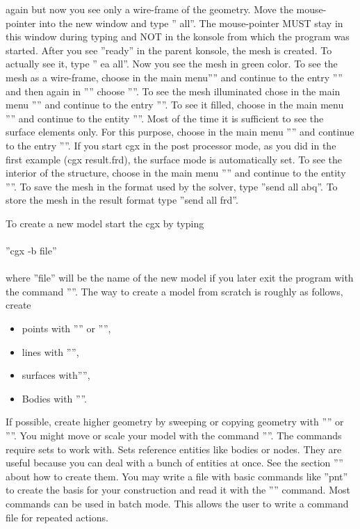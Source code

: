 \documentclass{article}
\begin{document}
again but now you see only a wire-frame of the geometry. Move the mouse-pointer into the new window and type '' all''. The mouse-pointer MUST stay in this window during typing and NOT in the konsole from which the program was started. After you see ''ready'' in the parent konsole, the mesh is created. To actually see it, type '' ea all''. Now you see the mesh in green color. To see the mesh as a wire-frame, choose in the main menu'''' and continue to the entry '''' and then again in '''' choose ''''. To see the mesh illuminated chose in the main menu '''' and continue to the entry ''''. To see it filled, choose in the main menu '''' and continue to the entity ''''. Most of the time it is sufficient to see the surface elements only. For this purpose, choose in the main menu '''' and continue to the entry ''''. If you start cgx in the post processor mode, as you did in the first example (cgx result.frd), the surface mode is automatically set. To see the interior of the structure, choose in the main menu '''' and continue to the entity ''''. To save the mesh in the format used by the solver, type ''send all abq''. To store the mesh in the result format type ''send all frd''. 

To create a new model start the cgx by typing\\\\  ''cgx -b file''\\\\where ''file'' will be the name of the new model if you later exit the program with the command ''''. The way to create a model from scratch is roughly as follows, create
\begin{itemize}
\item points with '''' or '''',
\item lines with '''',
\item surfaces with'''',
\item Bodies with ''''.
\end{itemize}
If possible, create higher geometry by sweeping or copying geometry with '''' or ''''. You might move or scale your model with the command ''''. The commands require sets to work with. Sets reference entities like bodies or nodes. They are useful because you can deal with a bunch of entities at once. See the section '''' about how to create them.
You may write a file with basic commands like ''pnt'' to create the basis for your construction and read it with the '''' command. Most commands can be used in batch mode. This allows the user to write a command file for repeated actions.
\end{document}
